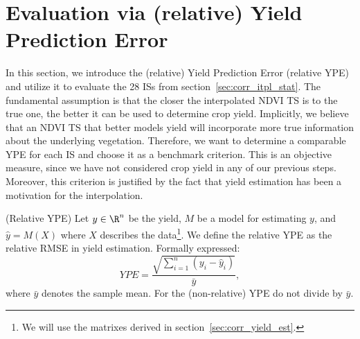 \section{Evaluation via (relative) Yield Prediction Error}{
    \label{sec:ndvi_corr_eval}
    In this section, we introduce the (relative) Yield Prediction Error (relative YPE) and utilize it to evaluate the 28 {{IS}}s from section~\ref{sec:corr_itpl_stat}. 
    The fundamental assumption is that the closer the interpolated NDVI {TS} is to the true one, the better it can be used to determine crop yield. Implicitly, we believe that an NDVI {TS} that better models yield will incorporate more true information about the underlying vegetation. 
    Therefore, we want to determine a comparable YPE for each {{IS}} and choose it as a benchmark criterion. 
    This is an objective measure, since we have not considered crop yield in any of our previous steps. Moreover, this criterion is justified by the fact that yield estimation has been a motivation for the interpolation.

    \begin{definition}(Relative YPE) \label{def:YPE}
        Let $y\in \R^n$ be the yield, $M$ be a model for estimating $y$, and $\hat y = M(X)$ where $X$ describes the data\footnote{We will use the matrixes derived in section~\ref{sec:corr_yield_est}.}. 
        We define the relative YPE as the relative RMSE in yield estimation. Formally expressed:
        \begin{equation}
            YPE = \frac{\sqrt{\sum_{i=1}^n(y_i - \hat y_i)}}{\bar y}, %
        \end{equation}
        where $\bar y$ denotes the sample mean. For the (non-relative) YPE do not divide by $\bar y$.
    \end{definition}

}
